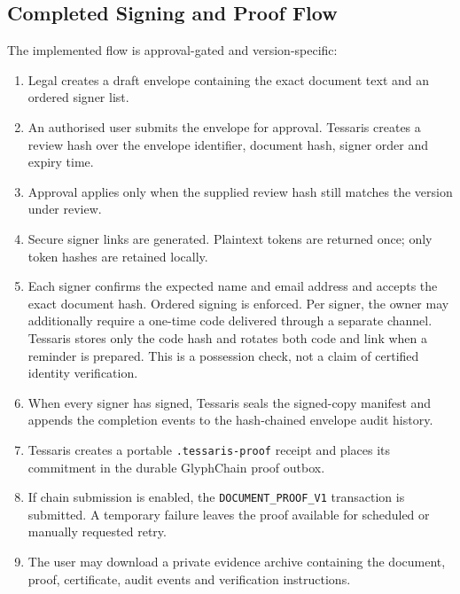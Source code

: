 \subsection{Completed Signing and Proof Flow}

The implemented flow is approval-gated and version-specific:

\begin{enumerate}
  \item Legal creates a draft envelope containing the exact document text and an
        ordered signer list.
  \item An authorised user submits the envelope for approval.  Tessaris creates a
        review hash over the envelope identifier, document hash, signer order and
        expiry time.
  \item Approval applies only when the supplied review hash still matches the
        version under review.
  \item Secure signer links are generated.  Plaintext tokens are returned once;
        only token hashes are retained locally.
  \item Each signer confirms the expected name and email address and accepts the
        exact document hash.  Ordered signing is enforced.  Per signer, the
        owner may additionally require a one-time code delivered through a
        separate channel.  Tessaris stores only the code hash and rotates both
        code and link when a reminder is prepared.  This is a possession check,
        not a claim of certified identity verification.
  \item When every signer has signed, Tessaris seals the signed-copy manifest and
        appends the completion events to the hash-chained envelope audit history.
  \item Tessaris creates a portable \texttt{.tessaris-proof} receipt and places
        its commitment in the durable GlyphChain proof outbox.
  \item If chain submission is enabled, the \texttt{DOCUMENT\_PROOF\_V1}
        transaction is submitted.  A temporary failure leaves the proof available
        for scheduled or manually requested retry.
  \item The user may download a private evidence archive containing the document,
        proof, certificate, audit events and verification instructions.
\end{enumerate}

